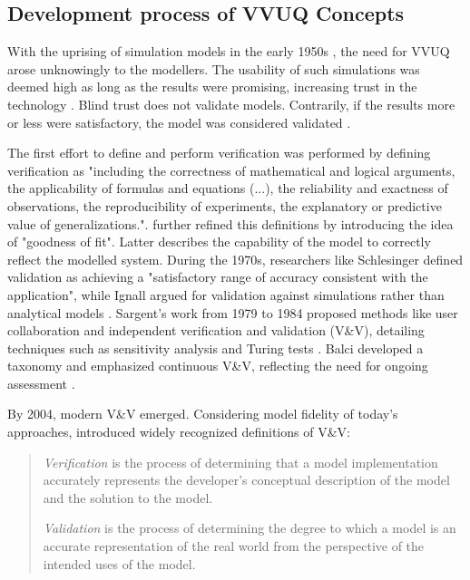 \subsection{Development process of VVUQ Concepts}
\label{sec:historical-development}
With the uprising of simulation models in the early 1950s \autocite{evans1967simulation}, the need for VVUQ arose unknowingly to the modellers. The usability of such simulations was deemed high as long as the results were promising, increasing trust in the technology \autocite{durst2017historical}. Blind trust does not validate models. Contrarily, if the results more or less were satisfactory, the model was considered validated \autocite{bonani2003physics}.

The first effort to define and perform verification was performed by \autocite{machlup1955problem} defining verification as "including the correctness of mathematical and logical arguments, the applicability of formulas and equations (...), the reliability and exactness of observations, the reproducibility of experiments, the explanatory or predictive value of generalizations.". \Autocite{naylor1967verification} further refined this definitions by introducing the idea of "goodness of fit". Latter describes the capability of the model to correctly reflect the modelled system. During the 1970s, researchers like Schlesinger \autocite{schlesinger1979terminology} defined validation as achieving a "satisfactory range of accuracy consistent with the application", while Ignall argued for validation against simulations rather than analytical models \autocite{ignall1978using}. Sargent's work from 1979 to 1984 proposed methods like user collaboration and independent verification and validation (V&V), detailing techniques such as sensitivity analysis and Turing tests \autocite{Sargent2010wsc}. Balci developed a taxonomy and emphasized continuous V&V, reflecting the need for ongoing assessment \autocite{balci2012life}.

By 2004, modern V&V emerged. Considering model fidelity of today's approaches, \autocite{Oberkampf2004amr} introduced widely recognized definitions of V&V:

\begin{quote}
  \textit{Verification} is the process of determining that a model implementation accurately represents the developer's conceptual description of the model and the solution to the model.

  \textit{Validation} is the process of determining the degree to which a model is an accurate representation of the real world from the perspective of the intended uses of the model. \autocite{Oberkampf2004amr}
\end{quote}

